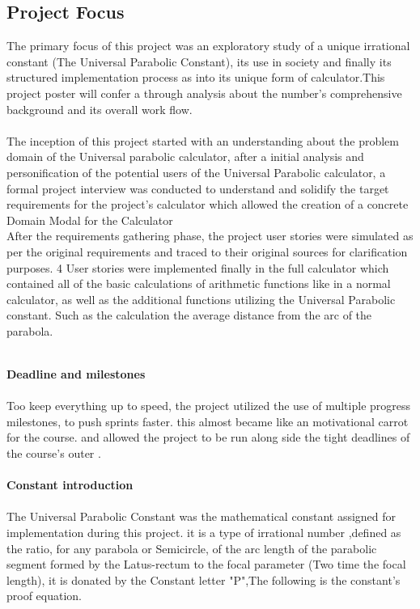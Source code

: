 \documentclass[30pt,a0,portrait]{a0poster}
\begin{document}
\begin{multicols}{2} %



\color{Black}
\section*{Project Focus}
\noindent The primary focus of this project was an exploratory study of a unique irrational constant (The Universal Parabolic Constant), its use in society and finally its structured implementation process as into its unique form of calculator.This project poster will confer a through analysis about the number's comprehensive background and its overall work flow.
\\

\\\noindent The inception of this project started with an understanding about the problem domain of the Universal parabolic calculator, after a initial analysis and personification of the potential users of the Universal Parabolic calculator, a formal project interview was conducted to understand and solidify the target requirements for the project's calculator which allowed the creation of a concrete Domain Modal for the Calculator \\ 

\noindent After the requirements gathering phase, the project user stories were simulated as per the original requirements and traced to their original sources for clarification purposes. 4 User stories were implemented finally in the full calculator which contained all of the basic calculations of arithmetic functions like in a normal calculator, as well as the additional functions utilizing the Universal Parabolic constant. Such as the calculation the average distance from the arc of the parabola. 
\hfill\break

\\\noindent \textbf{Deadline and milestones}\\\\
Too keep everything up to speed, the project utilized the use of multiple progress milestones, to push sprints faster. this almost became like an motivational carrot for the course. and allowed the project to be run along side the tight deadlines of the course's outer .
\hfill
\\
\\\textbf{Constant introduction}\\\\
\quad The Universal Parabolic Constant was the mathematical constant assigned for implementation during this project.  it is a type of irrational number ,defined as the ratio, for any parabola or Semicircle, of the arc length of the parabolic segment formed by the Latus-rectum to the focal parameter (Two time the focal length), it is donated by the Constant letter "P",The following is the constant's proof equation.


\end{multicols}
\end{document}
